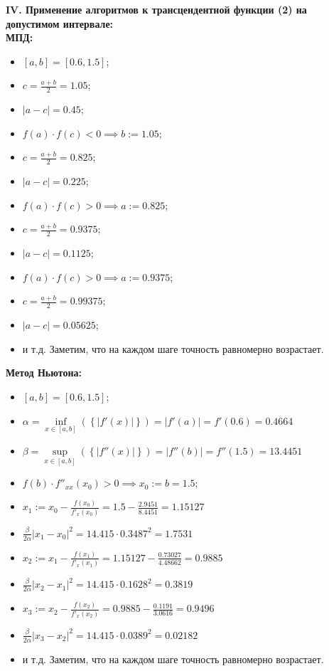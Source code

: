 {\large\bf{IV. Применение алгоритмов к трансцендентной функции (2) на допустимом интервале:}}\\
{\bf МПД:}
\begin{itemize}
    \item $[a, b]=[0.6, 1.5]$;
    \item $c=\frac{a+b}{2}=1.05;$
    \item $|a-c|=\mathbf{0.45}$;
    \item $f(a)\cdot f(c)<0\implies b:=1.05$;
    \item $c=\frac{a+b}{2}=0.825;$
    \item $|a-c|=\mathbf{0.225}$;
    \item $f(a)\cdot f(c)>0\implies a:=0.825$;
    \item $c=\frac{a+b}{2}=0.9375;$
    \item $|a-c|=\mathbf{0.1125}$;
    \item $f(a)\cdot f(c)>0\implies a:=0.9375$;
    \item $c=\frac{a+b}{2}=0.99375;$
    \item $|a-c|=\mathbf{0.05625}$;
    \item и т.д. Заметим, что на каждом шаге точность равномерно возрастает.
\end{itemize}

{\bf Метод Ньютона:}
\begin{itemize}
    \item $[a, b]=[0.6, 1.5]$;
    \item $\alpha = \inf\limits_{x \in [a,b]}(\left\{ |f'(x)|\right\}) = |f'(a)| = f'(0.6) = \mathbf{0.4664}$
    \item $\beta = \sup\limits_{x \in [a,b]}(\left\{ |f''(x)|\right\}) = |f''(b)| = f''(1.5) = \mathbf{13.4451}$
    \item $f(b)\cdot f''_{xx}(x_0) > 0 \implies x_0 := b = 1.5;$
    \item $x_1 := x_0 - \frac{f(x_0)}{f'_x(x_0)} = 1.5 - \frac{2.9451}{8.4451} = 1.15127$
    \item $\frac{\beta}{2\alpha}|x_1-x_0|^2 = 14.415 \cdot 0.3487^2 = \mathbf{1.7531}$
    \item $x_2 := x_1 - \frac{f(x_1)}{f'_x(x_1)} = 1.15127 - \frac{0.73027}{4.48662} = 0.9885$
    \item $\frac{\beta}{2\alpha}|x_2-x_1|^2 = 14.415 \cdot 0.1628^2 = \mathbf{0.3819}$
    \item $x_3 := x_2 - \frac{f(x_2)}{f'_x(x_2)} = 0.9885 - \frac{0.1191}{3.0616} = 0.9496$
    \item $\frac{\beta}{2\alpha}|x_3-x_2|^2 = 14.415 \cdot 0.0389^2 = \mathbf{0.02182}$
    \item и т.д. Заметим, что на каждом шаге точность равномерно возрастает.
\end{itemize}

